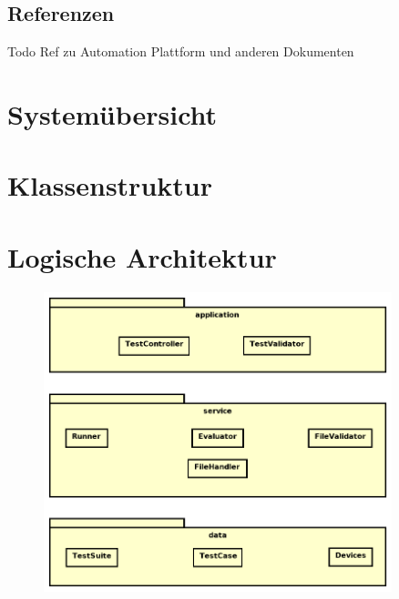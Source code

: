 \documentclass[a4,12pt]{scrartcl}
\begin{document}
\subsection{Referenzen}
\begin{description}
Todo Ref zu Automation Plattform und anderen Dokumenten
\end{description}
\newpage
\section{Systemübersicht}
\newpage
\section{Klassenstruktur}
\newpage
\section{Logische Architektur}
\begin{figure} [H]
	\begin{center}
	\includegraphics[width=0.90\textwidth]{./pictures/architektur.png}
	\label{Bild Referenz}
	\end{center}
\end{figure}
\end{document}

